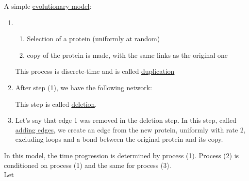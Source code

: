 \documentclass[11pt]{book}
\begin{document}
A simple \underline{evolutionary model}: \begin{enumerate}
\item \begin{enumerate}
\item Selection of a protein (uniformly at random)

\vspace{5 cm}

\item copy of the protein is made, with the same links as the original one

\vspace{5cm}
 
\end{enumerate}
This process is discrete-time and is called \underline{duplication}
\item After step (1), we have the following network:

\vspace{5 cm}

This step is called \underline{deletion}.

\item Let's say that edge 1 was removed in the deletion step. In this step, called \underline{adding edges}, we create an edge from the new protein, uniformly with rate 2, excluding loops and a bond between the original protein and its copy.

\vspace{5 cm}

\end{enumerate}
In this model, the time progression is determined by process (1). Process (2) is conditioned on process (1) and the same for process (3).\\

Let
\end{document}

